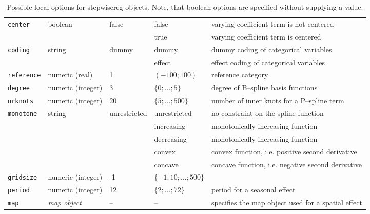 \begin{sidewaystable}[ht]
\begin{center}
\begin{tabular}{|l|l|l|l|l|}
\hline
 {\tt center}    & boolean                 & false & false & varying coefficient term is not centered  \\
                 &                         &       & true  & varying coefficient term is centered \\
\hline
 {\tt coding}    & string                  & dummy & dummy & dummy coding of categorical variables \\
                 &                         &       & effect & effect coding of categorical variables \\
\hline
 {\tt reference} & numeric (real)    & 1  & $(-100;100)$ & reference category \\
\hline
 {\tt degree}    & numeric (integer) & 3  & $\{0;\ldots;5\}$ & degree of B--spline basis functions \\
\hline
 {\tt nrknots}   & numeric (integer) & 20 & $\{5;\ldots;500\}$ & number of inner knots for a P--spline term \\
\hline
 {\tt monotone}  & string                  & unrestricted & unrestricted & no constraint on the spline function \\
                 &                         &              & increasing   & monotonically increasing function \\
                 &                         &              & decreasing   & monotonically increasing function \\
                 &                         &              & convex       & convex function, i.e. positive second derivative \\
                 &                         &              & concave      & concave function, i.e. negative second derivative \\
\hline
 {\tt gridsize}  & numeric (integer) & -1 & $\{-1;10;\ldots;500\}$ & \\
\hline
 {\tt period}    & numeric (integer) & 12 & $\{2;\ldots;72\}$ & period for a seasonal effect \\
\hline
 {\tt map}       & {\it map object}        & --    & --                & specifies the map object used for a spatial effect \\
 \hline
 \end{tabular}
 {\em\caption {\label{stepwisereg_localoptions} Possible local options
 for stepwisereg objects. Note, that boolean options are specified without supplying a value.}}
 \end{center}
 \end{sidewaystable}

